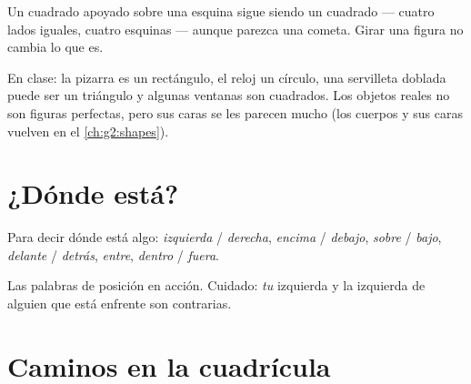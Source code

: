 \begin{example}\label{ex:g1:shapes:tilted}
Un cuadrado apoyado sobre una esquina sigue siendo un cuadrado --- cuatro
lados iguales, cuatro esquinas --- aunque parezca una cometa. Girar una
figura no cambia lo que es.
\end{example}

\begin{example}\label{ex:g1:shapes:hunt}
En clase: la pizarra es un rectángulo, el reloj un círculo, una
servilleta doblada puede ser un triángulo y algunas ventanas son cuadrados. Los
objetos reales no son figuras perfectas, pero sus caras se les parecen mucho
(los cuerpos y sus caras vuelven en el \cref{ch:g2:shapes}).
\end{example}

\section{¿Dónde está?}

\begin{definition}\label{def:g1:shapes:position}
Para decir dónde está algo: \emph{izquierda} / \emph{derecha},
\emph{encima} / \emph{debajo}, \emph{sobre} / \emph{bajo},
\emph{delante} / \emph{detrás}, \emph{entre},
\emph{dentro} / \emph{fuera}.
\end{definition}

\begin{omfigure}

{\small Las palabras de posición en acción. Cuidado: \emph{tu} izquierda y la
izquierda de alguien que está enfrente son contrarias.}
\end{omfigure}

\section{Caminos en la cuadrícula}

